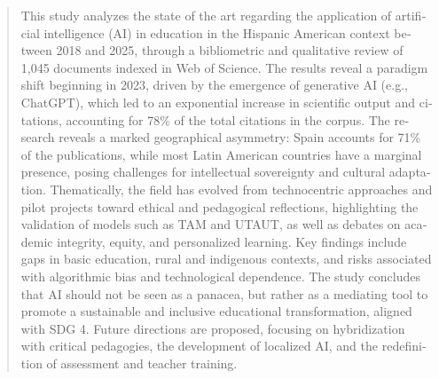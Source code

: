\documentclass[spanish]{textolivre}
\begin{document}
\begin{polyabstract}
\begin{portuguese}
\begin{abstract}
\end{abstract}
\end{portuguese}
\begin{english}
\begin{abstract}
This study analyzes the state of the art regarding the application of artificial intelligence (AI) in education in the Hispanic American context between 2018 and 2025, through a bibliometric and qualitative review of 1,045 documents indexed in Web of Science. The results reveal a paradigm shift beginning in 2023, driven by the emergence of generative AI (e.g., ChatGPT), which led to an exponential increase in scientific output and citations, accounting for 78\% of the total citations in the corpus. The research reveals a marked geographical asymmetry: Spain accounts for 71\% of the publications, while most Latin American countries have a marginal presence, posing challenges for intellectual sovereignty and cultural adaptation. Thematically, the field has evolved from technocentric approaches and pilot projects toward ethical and pedagogical reflections, highlighting the validation of models such as TAM and UTAUT, as well as debates on academic integrity, equity, and personalized learning. Key findings include gaps in basic education, rural and indigenous contexts, and risks associated with algorithmic bias and technological dependence. The study concludes that AI should not be seen as a panacea, but rather as a mediating tool to promote a sustainable and inclusive educational transformation, aligned with SDG 4. Future directions are proposed, focusing on hybridization with critical pedagogies, the development of localized AI, and the redefinition of assessment and teacher training.

\end{abstract}
\end{english}
\end{polyabstract}
\end{document}
